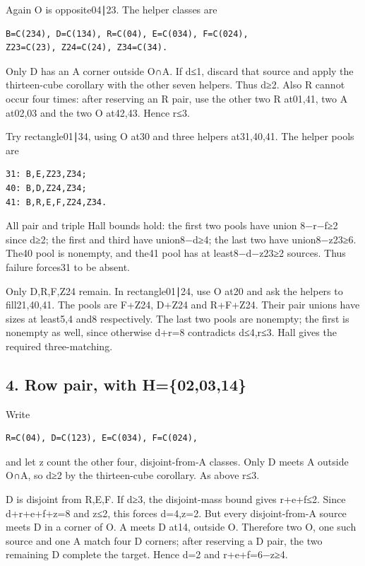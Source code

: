 \documentclass[
  10pt,
]{article}
\begin{document}
Again O is opposite04∣23. The helper classes are

\begin{verbatim}
B=C(234), D=C(134), R=C(04), E=C(034), F=C(024),
Z23=C(23), Z24=C(24), Z34=C(34).
\end{verbatim}

Only D has an A corner outside O∩A. If d≤1, discard that source and
apply the thirteen-cube corollary with the other seven helpers. Thus
d≥2. Also R cannot occur four times: after reserving an R pair, use the
other two R at01,41, two A at02,03 and the two O at42,43. Hence r≤3.

Try rectangle01∣34, using O at30 and three helpers at31,40,41. The
helper pools are

\begin{verbatim}
31: B,E,Z23,Z34;
40: B,D,Z24,Z34;
41: B,R,E,F,Z24,Z34.
\end{verbatim}

All pair and triple Hall bounds hold: the first two pools have union
8−r−f≥2 since d≥2; the first and third have union8−d≥4; the last two
have union8−z23≥6. The40 pool is nonempty, and the41 pool has at
least8−d−z23≥2 sources. Thus failure forces31 to be absent.

Only D,R,F,Z24 remain. In rectangle01∣24, use O at20 and ask the helpers
to fill21,40,41. The pools are F+Z24, D+Z24 and R+F+Z24. Their pair
unions have sizes at least5,4 and8 respectively. The last two pools are
nonempty; the first is nonempty as well, since otherwise d+r=8
contradicts d≤4,r≤3. Hall gives the required three-matching.

\hypertarget{row-pair-with-h020314}{%
\subsection*{4. Row pair, with
H=\{02,03,14\}}\label{row-pair-with-h020314}}

Write

\begin{verbatim}
R=C(04), D=C(123), E=C(034), F=C(024),
\end{verbatim}

and let z count the other four, disjoint-from-A classes. Only D meets A
outside O∩A, so d≥2 by the thirteen-cube corollary. As above r≤3.

D is disjoint from R,E,F. If d≥3, the disjoint-mass bound gives r+e+f≤2.
Since d+r+e+f+z=8 and z≤2, this forces d=4,z=2. But every
disjoint-from-A source meets D in a corner of O. A meets D at14, outside
O. Therefore two O, one such source and one A match four D corners;
after reserving a D pair, the two remaining D complete the target. Hence
d=2 and r+e+f=6−z≥4.
\end{document}

